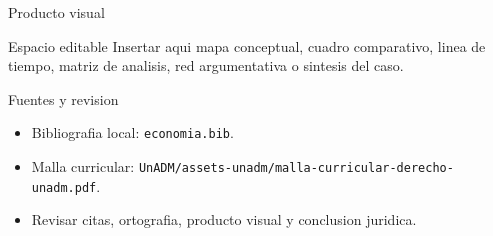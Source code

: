 \documentclass[
  spanish,
  aspectratio=169,
  xcolor={dvipsnames,table}
]{beamer}
\begin{document}
\begin{frame}{Producto visual}
  \begin{block}{Espacio editable}
    Insertar aqui mapa conceptual, cuadro comparativo, linea de tiempo,
    matriz de analisis, red argumentativa o sintesis del caso.
  \end{block}
  \centering
\end{frame}

\begin{frame}{Fuentes y revision}
  \begin{itemize}
    \item Bibliografia local: \texttt{economia.bib}.
    \item Malla curricular: \texttt{UnADM/assets-unadm/malla-curricular-derecho-unadm.pdf}.
    \item Revisar citas, ortografia, producto visual y conclusion juridica.
  \end{itemize}
\end{frame}
\end{document}
